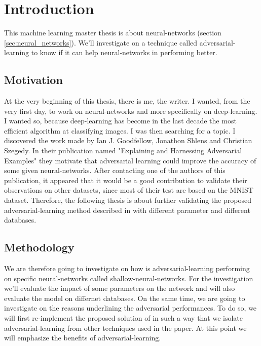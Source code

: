 
\section{Introduction} 
\label{sec:introduction}
	
	This machine learning master thesis is about neural-networks (section \ref{sec:neural_networks}). We'll investigate on a technique called adversarial-learning to know if it can help neural-networks in performing better.


	\subsection{Motivation}
		At the very beginning of this thesis, there is me, the writer. I wanted, from the very first day, to work on neural-networks and more specifically on deep-learning. I wanted so, because deep-learning has become in the last decade the most efficient algorithm at classifying images. 
		I was then searching for a topic. I discovered the work made by Ian J. Goodfellow, Jonathon Shlens and Christian Szegedy. In their publication named "Explaining and Harnessing Adversarial Examples"\cite{goodfellow2014explaining} they motivate that adversarial learning could improve the accuracy of some given neural-networks. After contacting one of the authors of this publication, it appeared that it would be a good contribution to validate their observations on other datasets, since most of their test are based on the MNIST dataset\cite{lecun-mnist}. Therefore, the following thesis is about further validating the proposed adversarial-learning method described in \cite{goodfellow2014explaining} with different parameter and different databases.

	\subsection{Methodology}
		We are therefore going to investigate on how is adversarial-learning performing on specific neural-networks called shallow-neural-networks. For the investigation we'll evaluate the impact of some parameters on the network and will also evaluate the model on differnet databases. On the same time, we are going to investigate on the reasons underlining the adversarial performances. To do so, we will first re-implement the proposed solution of \cite{goodfellow2014explaining} in such a way that we isolate adversarial-learning from other techniques used in the paper. At this point we will emphasize the benefits of adversarial-learning. 


